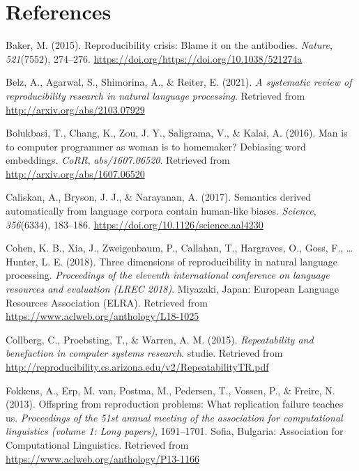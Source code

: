 \documentclass[
  english,
  man,floatsintext]{apa6}
\begin{document}
\newpage

\hypertarget{references}{%
\section{References}\label{references}}

\begingroup
\setlength{\parindent}{-0.5in}
\setlength{\leftskip}{0.5in}

\hypertarget{refs}{}
\leavevmode\hypertarget{ref-baker_2015}{}%
Baker, M. (2015). Reproducibility crisis: Blame it on the antibodies. \emph{Nature}, \emph{521}(7552), 274--276. \url{https://doi.org/https://doi.org/10.1038/521274a}

\leavevmode\hypertarget{ref-belz_2021}{}%
Belz, A., Agarwal, S., Shimorina, A., \& Reiter, E. (2021). \emph{A systematic review of reproducibility research in natural language processing}. Retrieved from \url{http://arxiv.org/abs/2103.07929}

\leavevmode\hypertarget{ref-bolukbasi_2016}{}%
Bolukbasi, T., Chang, K., Zou, J. Y., Saligrama, V., \& Kalai, A. (2016). Man is to computer programmer as woman is to homemaker? Debiasing word embeddings. \emph{CoRR}, \emph{abs/1607.06520}. Retrieved from \url{http://arxiv.org/abs/1607.06520}

\leavevmode\hypertarget{ref-caliskan_2017}{}%
Caliskan, A., Bryson, J. J., \& Narayanan, A. (2017). Semantics derived automatically from language corpora contain human-like biases. \emph{Science}, \emph{356}(6334), 183--186. \url{https://doi.org/10.1126/science.aal4230}

\leavevmode\hypertarget{ref-cohen_2018}{}%
Cohen, K. B., Xia, J., Zweigenbaum, P., Callahan, T., Hargraves, O., Goss, F., \ldots{} Hunter, L. E. (2018). Three dimensions of reproducibility in natural language processing. \emph{Proceedings of the eleventh international conference on language resources and evaluation (LREC 2018)}. Miyazaki, Japan: European Language Resources Association (ELRA). Retrieved from \url{https://www.aclweb.org/anthology/L18-1025}

\leavevmode\hypertarget{ref-collberg_2015}{}%
Collberg, C., Proebsting, T., \& Warren, A. M. (2015). \emph{Repeatability and benefaction in computer systems research}. studie. Retrieved from \url{http://reproducibility.cs.arizona.edu/v2/RepeatabilityTR.pdf}

\leavevmode\hypertarget{ref-fokkens_2013}{}%
Fokkens, A., Erp, M. van, Postma, M., Pedersen, T., Vossen, P., \& Freire, N. (2013). Offspring from reproduction problems: What replication failure teaches us. \emph{Proceedings of the 51st annual meeting of the association for computational linguistics (volume 1: Long papers)}, 1691--1701. Sofia, Bulgaria: Association for Computational Linguistics. Retrieved from \url{https://www.aclweb.org/anthology/P13-1166}
\end{document}
